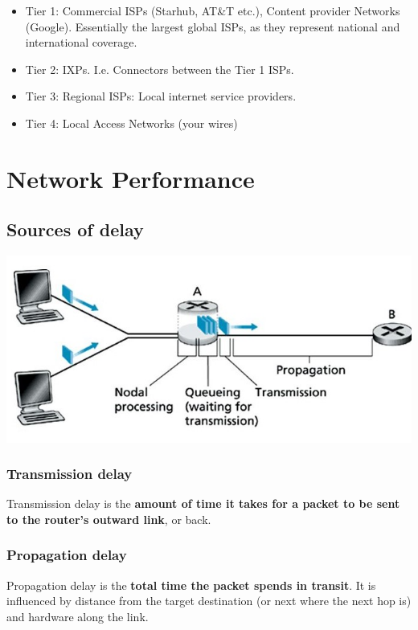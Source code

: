 \documentclass{article}
\begin{document}
\begin{itemize}
\item Tier 1: Commercial ISPs (Starhub, AT\&T etc.), Content provider Networks (Google). Essentially the largest global ISPs, as they represent national and international coverage.
\item Tier 2: IXPs. I.e. Connectors between the Tier 1 ISPs.
\item Tier 3: Regional ISPs: Local internet service providers.
\item Tier 4: Local Access Networks (your wires)
\end{itemize}

\section{Network Performance}
\subsection{Sources of delay}

\begin{center}
\includegraphics[width=\textwidth]{delays.jpg}
\end{center}

\subsubsection{Transmission delay}
Transmission delay is the \textbf{amount of time it takes for a packet to be sent to the router's outward link}, or back.

\subsubsection{Propagation delay}
Propagation delay is the \textbf{total time the packet spends in transit}. It is influenced by distance from the target destination (or next where the next hop is) and hardware along the link.
\end{document}
